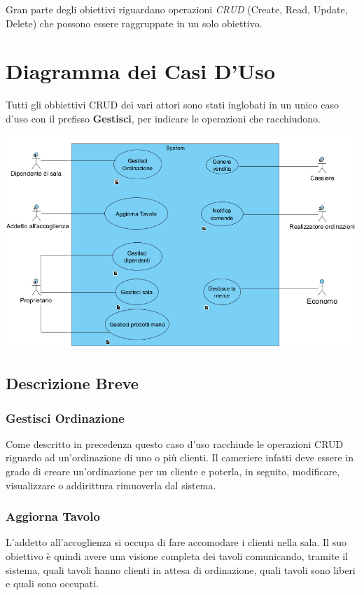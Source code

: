 Gran parte degli obiettivi riguardano operazioni \textit{CRUD} (Create, Read, Update, Delete) che possono essere raggruppate in un solo obiettivo.

\section{Diagramma dei Casi D'Uso}
Tutti gli obbiettivi CRUD dei vari attori sono stati inglobati in un unico caso d'uso con il prefisso \textbf{Gestisci}, per indicare le operazioni che racchiudono.
\begin{centering}[H]
	\includegraphics[width=\textwidth]{Immagini/DiagrammaCasiUso.png}
\end{centering}

\subsection{Descrizione Breve}
\subsubsection{Gestisci Ordinazione}
Come descritto in precedenza questo caso d'uso racchiude le operazioni CRUD riguardo ad un'ordinazione di uno o più clienti. Il cameriere infatti deve essere in grado di creare un'ordinazione per un cliente e poterla, in seguito, modificare, visualizzare o addirittura rimuoverla dal sistema.

\subsubsection{Aggiorna Tavolo}
L'addetto all'accoglienza si occupa di fare accomodare i clienti nella sala. Il suo obiettivo è quindi avere una visione completa dei tavoli comunicando, tramite il sistema, quali tavoli hanno clienti in attesa di ordinazione, quali tavoli sono liberi e quali sono occupati.

